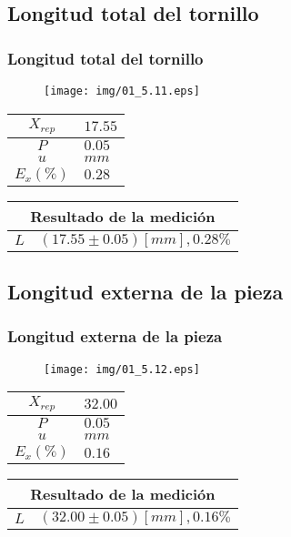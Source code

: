 \documentclass[letter,11pt]{beamer}
\begin{document}
\subsection{Longitud total del tornillo}
\begin{frame}
\frametitle{Longitud total del tornillo}
\vspace*{0.8cm}
\begin{figure}
\centering
\texttt{[image: img/01\_5.11.eps]}
\end{figure}
\vspace*{0.4cm}
\scriptsize
\begin{tabular}{|c|>{\centering}m{1.8cm}<{\centering}|}
\hline
$X_{rep}$ &  $17.55$ \tabularnewline \hline
      $P$ &   $0.05$ \tabularnewline \hline
      $u$ &     $mm$ \tabularnewline \hline
$E_x(\%)$ &   $0.28$ \tabularnewline \hline
\end{tabular}
\quad
\begin{tabular}{|c|>{\centering}m{5.7cm}<{\centering}|}
\hline
\multicolumn{2}{|c|}{\textbf{Resultado de la medición}} \\ \hline
$L$ & $( 17.55\pm0.05)[mm], 0.28\%$ \tabularnewline \hline
\end{tabular}
\end{frame}

\subsection{Longitud externa de la pieza}
\begin{frame}
\frametitle{Longitud externa de la pieza}
\vspace*{0.8cm}
\begin{figure}
\centering
\texttt{[image: img/01\_5.12.eps]}
\end{figure}
\vspace*{0.4cm}
\scriptsize
\begin{tabular}{|c|>{\centering}m{1.8cm}<{\centering}|}
\hline
$X_{rep}$ &  $32.00$ \tabularnewline \hline
      $P$ &   $0.05$ \tabularnewline \hline
      $u$ &     $mm$ \tabularnewline \hline
$E_x(\%)$ &   $0.16$ \tabularnewline \hline
\end{tabular}
\quad
\begin{tabular}{|c|>{\centering}m{5.7cm}<{\centering}|}
\hline
\multicolumn{2}{|c|}{\textbf{Resultado de la medición}} \\ \hline
$L$ & $( 32.00\pm0.05)[mm], 0.16\%$ \tabularnewline \hline
\end{tabular}
\end{frame}
\end{document}
